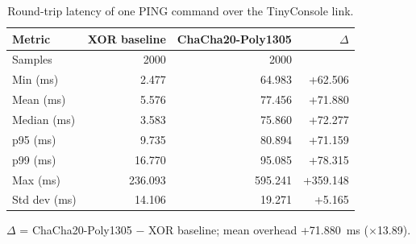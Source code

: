 \begin{table}[ht]
  \centering
  \caption{Round-trip latency of one PING command over the TinyConsole link.}
  \label{tab:latency}
  \begin{tabular}{lrrr}
    \toprule
    Metric & XOR baseline & ChaCha20-Poly1305 & $\Delta$ \\
    \midrule
    Samples & 2000 & 2000 &  \\
    Min (ms) & 2.477 & 64.983 & +62.506 \\
    Mean (ms) & 5.576 & 77.456 & +71.880 \\
    Median (ms) & 3.583 & 75.860 & +72.277 \\
    p95 (ms) & 9.735 & 80.894 & +71.159 \\
    p99 (ms) & 16.770 & 95.085 & +78.315 \\
    Max (ms) & 236.093 & 595.241 & +359.148 \\
    Std dev (ms) & 14.106 & 19.271 & +5.165 \\
    \bottomrule
  \end{tabular}
  \par\smallskip
  \footnotesize $\Delta$ = ChaCha20-Poly1305 $-$ XOR baseline; mean overhead +71.880~ms ($\times$13.89).
\end{table}
